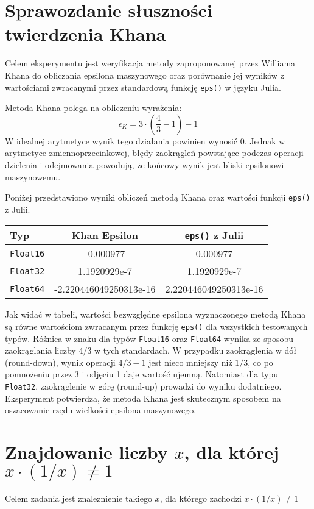 \documentclass[a4paper,12pt]{article}
\begin{document}
\section{ Sprawozdanie słuszności twierdzenia Khana}
Celem eksperymentu jest weryfikacja metody zaproponowanej przez Williama Khana do obliczania epsilona maszynowego oraz porównanie jej wyników z wartościami zwracanymi przez standardową funkcję \texttt{eps()} w języku Julia.

Metoda Khana polega na obliczeniu wyrażenia:
\[ \epsilon_K = 3 \cdot (\frac{4}{3} - 1) - 1 \]
W idealnej arytmetyce wynik tego działania powinien wynosić 0. Jednak w arytmetyce zmiennoprzecinkowej, błędy zaokrągleń powstające podczas operacji dzielenia i odejmowania powodują, że końcowy wynik jest bliski epsilonowi maszynowemu.

Poniżej przedstawiono wyniki obliczeń metodą Khana oraz wartości funkcji \texttt{eps()} z Julii.

\begin{center}
\begin{tabular}{l c c}
\hline
Typ & Khan Epsilon & \texttt{eps()} z Julii \\
\hline
\texttt{Float16} & -0.000977 & 0.000977 \\
\texttt{Float32} & 1.1920929e-7 & 1.1920929e-7 \\
\texttt{Float64} & -2.220446049250313e-16 & 2.220446049250313e-16 \\
\hline
\end{tabular}
\end{center}

Jak widać w tabeli, wartości bezwzględne epsilona wyznaczonego metodą Khana są równe wartościom zwracanym przez funkcję \texttt{eps()} 
dla wszystkich testowanych typów. Różnica w znaku dla typów \texttt{Float16} oraz \texttt{Float64} wynika ze sposobu zaokrąglania liczby $4/3$ w tych standardach. W przypadku zaokrąglenia w dół (round-down), wynik operacji $4/3 - 1$ jest nieco mniejszy niż $1/3$, co po pomnożeniu przez 3 i odjęciu 1 daje wartość ujemną. Natomiast dla typu \texttt{Float32}, zaokrąglenie w górę (round-up) prowadzi do wyniku dodatniego. Eksperyment potwierdza, że metoda Khana jest skutecznym sposobem na oszacowanie rzędu wielkości epsilona maszynowego.

\section{}

\section{Znajdowanie liczby \(x\), dla której \(x \cdot (1/x) \neq 1\)}
Celem zadania jest znaleznienie takiego \(x\), dla którego zachodzi \(x \cdot (1/x) \neq 1\)
\end{document}

